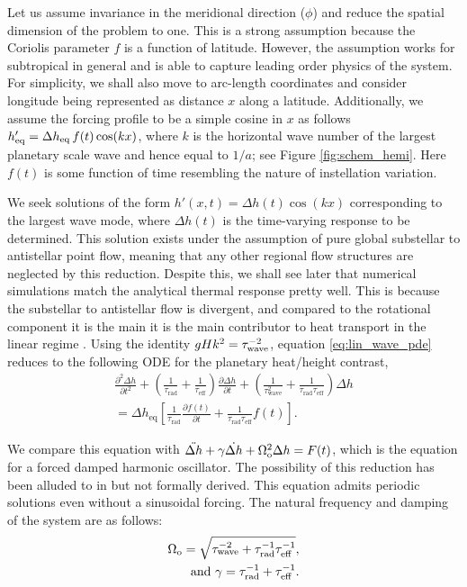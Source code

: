 \documentclass[trackchanges,twocolumn]{aastex7}
\begin{document}

Let us assume invariance in the meridional direction ($\phi$) and reduce the spatial dimension of the problem to one. This is a strong assumption because the Coriolis parameter $f$ is a function of latitude. However, the assumption works for subtropical in general and is able to capture leading order physics of the system. For simplicity, we shall also move to arc-length coordinates and consider longitude being represented as distance $x$ along a latitude. Additionally, we assume the forcing profile to be a simple cosine in $x$ as follows $h_{\rm eq}'=\Delta h_{\rm eq}\,f(t) \cos(kx)$, where $k$ is the horizontal wave number of the largest planetary scale wave and hence equal to $1/a$; see Figure \ref{fig:schem_hemi}. Here $f(t)$ is some function of time resembling the nature of instellation variation.

We seek solutions of the form
   $ h'(x,t) = \Delta h(t) \cos(kx) \label{eq:ansatz}$ corresponding to the largest wave mode,
where $\Delta h(t)$ is the time-varying response to be determined. This solution exists under the assumption of pure global substellar to antistellar point flow, meaning that any other regional flow structures are neglected by this reduction. Despite this, we shall see later that numerical simulations match the analytical thermal response pretty well. This is because the substellar to antistellar flow is divergent, and compared to the rotational component it is the main it is the main contributor to heat transport in the linear regime \citep{hammond2021rotational}. Using the identity $gHk^2 = \tau_{\rm wave}^{-2}$, equation \eqref{eq:lin_wave_pde} reduces to the following ODE for the planetary heat/height contrast,
\begin{align}
     \frac{\partial^2{\Delta h}}{\partial t^2} + \left( \frac{1}{\tau_{\text{rad}}} + \frac{1}{\tau_{\text{eff}}} \right) \frac{\partial \Delta h}{\partial t} + \left( \frac{1}{\tau_{\text{wave}}^2} + \frac{1}{\tau_{\text{rad}}\tau_{\text{eff}}} \right) \Delta h \nonumber \\
     = \Delta h_{\text{eq}} \left[\frac{1}{\tau_{\text{rad}}} \frac{\partial f(t)}{\partial t} + \frac{1}{\tau_{\text{rad}}\tau_{\text{eff}}} f(t) \right].
     \label{eq:so_ode}
\end{align}

We compare this equation with $\ddot{\Delta h} + \gamma \dot{\Delta h} + \Omega_{\rm o}^2 \Delta h =  F(t)$, which is the equation for a forced damped harmonic oscillator. The possibility of this reduction has been alluded to in \cite{Shamir2023} but not formally derived. This equation admits periodic solutions even without a sinusoidal forcing. The natural frequency and damping of the system are as follows:
\begin{align}
    \Omega_{\rm o} = \sqrt{\tau_{\rm wave}^{-2} + \tau_{\rm rad}^{-1}\tau_{\rm eff}^{-1}}, \nonumber \\
    \text{and } \gamma = \tau_{\rm rad}^{-1} + \tau_{\rm eff}^{-1}.
    \label{eq:nat_freq_damp}
\end{align} 
\end{document}
